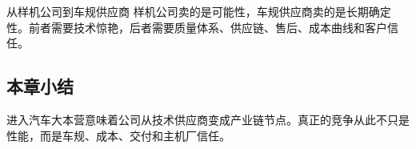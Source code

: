 \begin{importantbox}{从样机公司到车规供应商}
样机公司卖的是可能性，车规供应商卖的是长期确定性。前者需要技术惊艳，后者需要质量体系、供应链、售后、成本曲线和客户信任。
\end{importantbox}

\subsection{本章小结}

进入汽车大本营意味着公司从技术供应商变成产业链节点。真正的竞争从此不只是性能，而是车规、成本、交付和主机厂信任。

